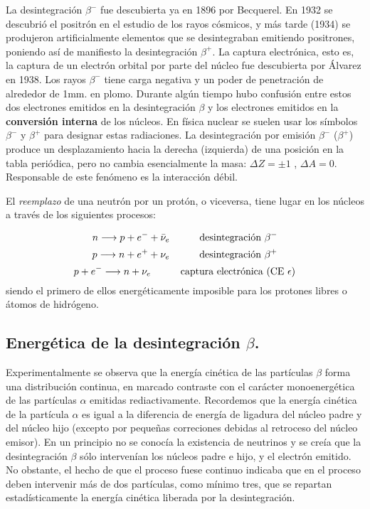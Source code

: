 La desintegración $\beta^-$ fue descubierta ya en 1896 por Becquerel. En 1932 se descubrió el positrón en el estudio de los rayos cósmicos, y más tarde (1934) se produjeron artificialmente elementos que se desintegraban emitiendo positrones, poniendo así de manifiesto la desintegración $\beta^+$. La captura electrónica, esto es, la captura de un electrón orbital por parte del núcleo fue descubierta por Álvarez en 1938. Los rayos $\beta^-$ tiene carga negativa y un poder de penetración de alrededor de 1mm. en plomo. Durante algún tiempo hubo confusión entre estos dos electrones emitidos en la desintegración $\beta$ y los electrones emitidos en la \textbf{conversión interna} de los núcleos. En física nuclear se suelen usar los símbolos $\beta^-$ y $\beta^+$ para designar estas radiaciones. La desintegración por emisión $\beta^-$ ($\beta^+$) produce un desplazamiento hacia la derecha (izquierda) de una posición en la tabla periódica, pero no cambia esencialmente la masa: $\Delta Z= \pm 1$ , $\Delta A = 0$. Responsable de este fenómeno es la interacción débil.

El \textit{reemplazo} de una neutrón por un protón, o viceversa, tiene lugar en los núcleos a través de los siguientes procesos:

\begin{equation}
	n \longrightarrow p + e^- + \bar{\nu}_e  \quad \quad \quad \text{desintegración} \ \beta^-
\end{equation}
\begin{equation}
	p \longrightarrow n + e^+ + {\nu}_e \quad \quad \quad \text{desintegración} \ \beta^+
\end{equation}
\begin{equation}
	p + e^- \longrightarrow n + {\nu}_e \quad \quad \quad \text{captura electrónica (CE} \ \epsilon)
\end{equation}
siendo el primero de ellos energéticamente imposible para los protones libres o átomos de hidrógeno. 

\subsection{Energética de la desintegración $\beta$.}

Experimentalmente se observa que la energía cinética de las partículas $\beta$ forma una distribución continua, en marcado contraste con el carácter monoenergética de las partículas $\alpha$ emitidas rediactivamente. Recordemos que la energía cinética de la partícula $\alpha$ es igual a la diferencia de energía de ligadura del núcleo padre y del núcleo hijo (excepto por pequeñas correciones debidas al retroceso del núcleo emisor). En un principio no se conocía la existencia de neutrinos y se creía que la desintegración $\beta$ sólo intervenían los núcleos padre e hijo, y el electrón emitido. No obstante, el hecho de que el proceso fuese continuo indicaba que en el proceso deben intervenir más de dos partículas, como mínimo tres, que se repartan estadísticamente la energía cinética liberada por la desintegración. 

